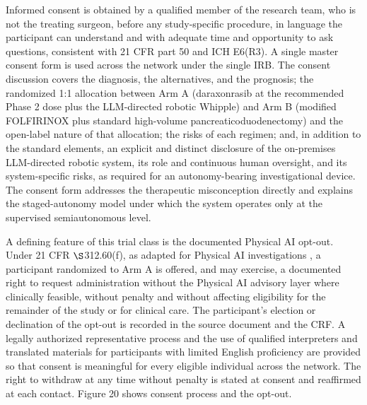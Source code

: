 Informed consent is obtained by a qualified member of the research team, who is not
the treating surgeon, before any study-specific procedure, in language the
participant can understand and with adequate time and opportunity to ask questions,
consistent with 21 CFR part 50 \cite{ecfr2026part50} and ICH E6(R3). A single
master consent form is used across the network under the single IRB. The consent
discussion covers the diagnosis, the alternatives, and the prognosis; the
randomized 1:1 allocation between Arm A (daraxonrasib at the recommended Phase 2
dose plus the LLM-directed robotic Whipple) and Arm B (modified FOLFIRINOX plus
standard high-volume pancreaticoduodenectomy) and the open-label nature of that
allocation; the risks of each regimen; and, in addition to the standard elements,
an explicit and distinct disclosure of the on-premises LLM-directed robotic system,
its role and continuous human oversight, and its system-specific risks, as required
for an autonomy-bearing investigational device. The consent form addresses the
therapeutic misconception directly and explains the staged-autonomy model under
which the system operates only at the supervised semiautonomous level.

A defining feature of this trial class is the documented Physical AI opt-out. Under
21 CFR $\S$312.60(f), as adapted for Physical AI investigations
\cite{kawchak2026adapt312}, a participant randomized to Arm A is offered, and may
exercise, a documented right to request administration without the Physical AI
advisory layer where clinically feasible, without penalty and without affecting
eligibility for the remainder of the study or for clinical care. The participant's
election or declination of the opt-out is recorded in the source document and the
CRF. A legally authorized representative process and the use of qualified
interpreters and translated materials for participants with limited English
proficiency are provided so that consent is meaningful for every eligible individual
across the network. The right to withdraw at any time without penalty is stated at
consent and reaffirmed at each contact. Figure 20 shows consent process and the
opt-out.

